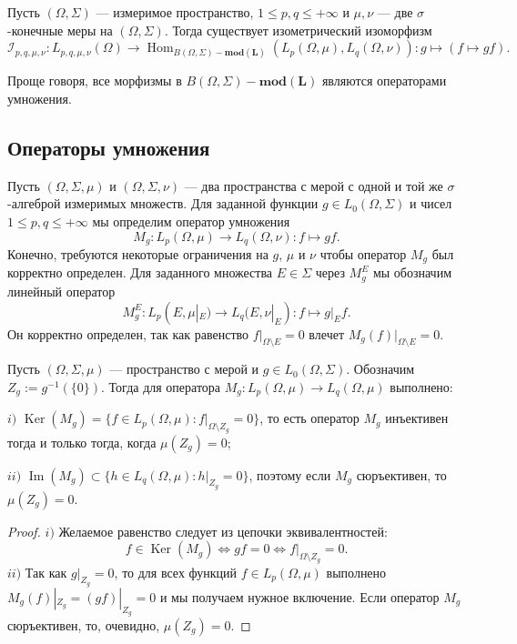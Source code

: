 \begin{theorem}\label{LpModMorphCharac}
Пусть $(\Omega,\Sigma)$ --- измеримое пространство, $1\leq p,q\leq +\infty$ и $\mu,\nu$ --- две $\sigma$-конечные меры на $(\Omega, \Sigma)$. Тогда существует изометрический изоморфизм
$$
\mathcal{I}_{p,q,\mu,\nu}:L_{p,q,\mu,\nu}(\Omega)\to\operatorname{Hom}_{B(\Omega,\Sigma)-\mathbf{mod(L)}}(L_p(\Omega,\mu),L_q(\Omega,\nu)):g\mapsto (f\mapsto g f).
$$
\end{theorem}

Проще говоря, все морфизмы в $B(\Omega,\Sigma)-\mathbf{mod(L)}$ являются операторами умножения.


\subsection{Операторы умножения}
\label{SubSectionMultiplicationOperators}

Пусть $(\Omega,\Sigma,\mu)$ и $(\Omega,\Sigma,\nu)$ --- два пространства с мерой с одной и той же $\sigma$-алгеброй измеримых множеств. Для заданной функции $g\in L_0(\Omega,\Sigma)$ и чисел $1\leq p,q\leq +\infty$ мы определим оператор умножения
$$
M_g:L_p(\Omega,\mu)\to L_q(\Omega,\nu): f\mapsto g f.
$$ 
Конечно, требуются некоторые ограничения на $g$, $\mu$ и $\nu$ чтобы оператор $M_g$ был корректно определен. Для заданного множества $E\in\Sigma$ через $M_g^E$ мы обозначим линейный оператор
$$
M_g^E:L_p(E,\mu|_E)\to L_q(E,\nu|_E):f\mapsto g|_E f.
$$
Он корректно определен, так как равенство $f|_{\Omega\setminus E}=0$ влечет $M_g(f)|_{\Omega\setminus E}=0$. 

\begin{proposition}\label{MultpOpSurjInjDesc} Пусть $(\Omega,\Sigma,\mu)$ --- пространство с мерой и $g\in L_0(\Omega,\Sigma)$. Обозначим $Z_g:=g^{-1}(\{0\})$. Тогда для оператора $M_g:L_p(\Omega,\mu)\to L_q(\Omega,\mu)$ выполнено:

$i)$ $\operatorname{Ker}(M_g)=\{f\in L_p(\Omega,\mu):f|_{\Omega\setminus {Z_g}}=0\}$, то есть оператор $M_g$ инъективен тогда и только тогда, когда $\mu(Z_g)=0$;

$ii)$ $\operatorname{Im}(M_g)\subset\{h\in L_q(\Omega,\mu): h|_{Z_g}=0\}$, поэтому если $M_g$ сюръективен, то $\mu(Z_g)=0$.

\end{proposition}
\begin{proof}
$i)$ Желаемое равенство следует из цепочки эквивалентностей:
$$
f\in\operatorname{Ker}(M_g)
\Longleftrightarrow g f=0
\Longleftrightarrow f|_{\Omega\setminus Z_g}=0.
$$
$ii)$ Так как $g|_{Z_g}=0$, то для всех функций $f\in L_p(\Omega,\mu)$ выполнено $M_g(f)|_{Z_g}=(g f)|_{Z_g}=0$ и мы получаем нужное включение. Если оператор $M_g$ сюръективен, то, очевидно, $\mu(Z_g)=0$.
\end{proof} 

